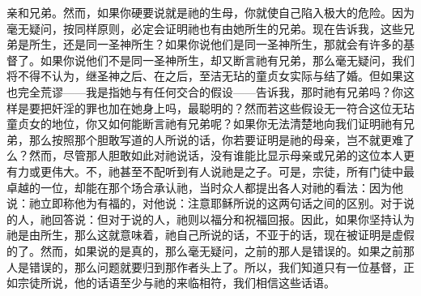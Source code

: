 亲和兄弟。然而，如果你硬要说就是祂的生母，你就使自己陷入极大的危险。因为毫无疑问，按同样原则，必定会证明祂也有由她所生的兄弟。现在告诉我，这些兄弟是所生，还是同一圣神所生？如果你说他们是同一圣神所生，那就会有许多的基督了。如果你说他们不是同一圣神所生，却又断言祂有兄弟，那么毫无疑问，我们将不得不认为，继圣神之后、在之后，至洁无玷的童贞女实际与结了婚。但如果这也完全荒谬——我是指她与有任何交合的假设——告诉我，那时祂有兄弟吗？你这样是要把奸淫的罪也加在她身上吗，最聪明的？然而若这些假设无一符合这位无玷童贞女的地位，你又如何能断言祂有兄弟呢？如果你无法清楚地向我们证明祂有兄弟，那么按照那个胆敢写道的人所说的话，你若要证明是祂的母亲，岂不就更难了么？然而，尽管那人胆敢如此对祂说话，没有谁能比显示母亲或兄弟的这位本人更有力或更伟大。不，祂甚至不配听到有人说祂是之子。可是，宗徒，所有门徒中最卓越的一位，却能在那个场合承认祂，当时众人都提出各人对祂的看法：因为他说：祂立即称他为有福的，对他说：注意耶稣所说的这两句话之间的区别。对于说的人，祂回答说：但对于说的人，祂则以福分和祝福回报。因此，如果你坚持认为祂是由所生，那么这就意味着，祂自己所说的话，不亚于的话，现在被证明是虚假的了。然而，如果说的是真的，那么毫无疑问，之前的那人是错误的。如果之前那人是错误的，那么问题就要归到那作者头上了。所以，我们知道只有一位基督，正如宗徒所说，他的话语至少与祂的来临相符，我们相信这些话语。\par

